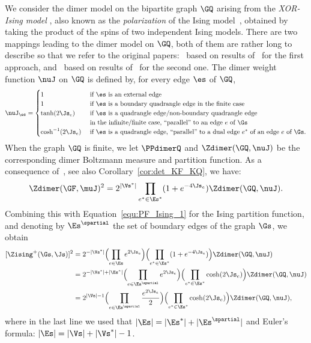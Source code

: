 \documentclass[a4paper,twoside,11pt]{article}
\begin{document}
We consider the dimer model on the bipartite graph $\GQ$ arising from the \emph{XOR-Ising model} \cite{WilsonXOR}, also known as 
the \emph{polarization} of the Ising model~\cite{KadanoffBrown}, obtained by taking the product of the spins of two independent
Ising models. There are two mappings leading to the dimer model on $\GQ$, both of them are rather long to describe so that 
we refer to the original papers:~\cite{Dubedat} based on results of~\cite{KadanoffWegner,Wu71,FanWu,WuLin} for the first approach,
and~\cite{BoutillierdeTiliere:XORloops} based on results of~\cite{Nienhuis,WuLin} for the second one. The dimer weight function 
$\nuJ$ on $\GQ$ is defined by, for every edge $\es$ of $\GQ$,
\begin{equation*}
\nuJ_{\es}=
\begin{cases}
1&\text{ if $\es$ is an external edge}\\
1&\text{ if $\es$ is a boundary quadrangle edge in the finite case}\\
\tanh(2\Js_e)&\text{ if $\es$ is a quadrangle edge/non-boundary quadrangle edge}\\
&\text{ in the infinite/finite case, ``parallel'' to an edge $e$ of $\Gs$}\\
\cosh^{-1}(2\Js_e)&\text{ if $\es$ is a quadrangle edge, ``parallel'' to a dual edge $e^*$ of an edge $e$ of $\Gs$}.
\end{cases}
\end{equation*}
When the graph $\GQ$ is finite, we let $\PPdimerQ$ and $\Zdimer(\GQ,\nuJ)$ be the corresponding dimer Boltzmann measure and partition function.
As a consequence of~\cite{Dubedat}, see also Corollary~\ref{cor:det_KF_KQ}, we have:
\begin{equation*}
\Zdimer(\GF,\muJ)^2=2^{|\Vs^*|}\prod_{e^*\in \Es^*}(1+e^{-4\Js_e})\Zdimer(\GQ,\nuJ).
\end{equation*}
Combining this with Equation~\eqref{equ:PF_Ising_1} for the Ising partition function, and denoting by $\Es^\spartial$
the set of boundary edges of the graph $\Gs$, we obtain
\begin{align}\label{equ:PF_Ising_2}
[\Zising^+(\Gs,\Js)]^2&=
2^{-|\Vs^*|}\Bigl(\prod_{e\in\Es} e^{2\Js_e}\Bigr)\Bigl(\prod_{e^*\in\Es^*}(1+e^{-4\Js_e})\Bigr)\Zdimer(\GQ,\nuJ)\nonumber \\
&=2^{-|\Vs^*|+|\Es^*|}\Bigl(\prod_{e\in\Es^\spartial} e^{2\Js_e}\Bigr)\Bigl(\prod_{e^*\in\Es^*}\cosh(2\Js_e)\Bigr)\Zdimer(\GQ,\nuJ)\nonumber \\
&= 2^{|\Vs|-1}\Bigl(\prod_{e\in\Es^\spartial} \frac{e^{2\Js_e}}{2}\Bigr)\Bigl(\prod_{e^*\in\Es^*}\cosh(2\Js_e)\Bigr)\Zdimer(\GQ,\nuJ),
\end{align}
where in the last line we used that $|\Es|=|\Es^*|+|\Es^\spartial|$ and Euler's formula: $|\Es|=|\Vs|+|\Vs^*|-1$.
\end{document}
